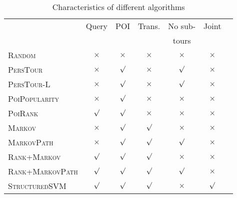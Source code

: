 \begin{table}
\centering\small
\begin{tabular}{l|cccccc} \hline
                                    & Query    & POI      & Trans. & No sub- & Joint    \\
                                    &     &       &  & tours &     \\ \hline
\textsc{Random}                     & $\times$ & $\times$ & $\times$   & $\times$     & $\times$ \\
\textsc{PersTour}\cite{ijcai15}     & $\times$ & $\surd$  & $\times$   & $\surd$      & $\times$ \\
\textsc{PersTour-L}                 & $\times$ & $\surd$  & $\times$   & $\surd$      & $\times$ \\
\textsc{PoiPopularity}              & $\times$ & $\surd$  & $\times$   & $\times$     & $\times$ \\
\textsc{PoiRank}                    & $\surd$  & $\surd$  & $\times$   & $\times$     & $\times$ \\
\textsc{Markov}                     & $\times$ & $\surd$  & $\surd$    & $\times$     & $\times$ \\
\textsc{MarkovPath}                 & $\times$ & $\surd$  & $\surd$    & $\surd$      & $\times$ \\
\textsc{Rank}+\textsc{Markov}     & $\surd$  & $\surd$  & $\surd$    & $\times$     & $\times$ \\
\textsc{Rank}+\textsc{MarkovPath} & $\surd$  & $\surd$  & $\surd$    & $\surd$      & $\times$ \\
\textsc{StructuredSVM}              & $\surd$  & $\surd$  & $\surd$    & $\times$     & $\surd$  \\ \hline
\end{tabular}
\caption{Characteristics of different algorithms}
\label{table:character}
\end{table}



